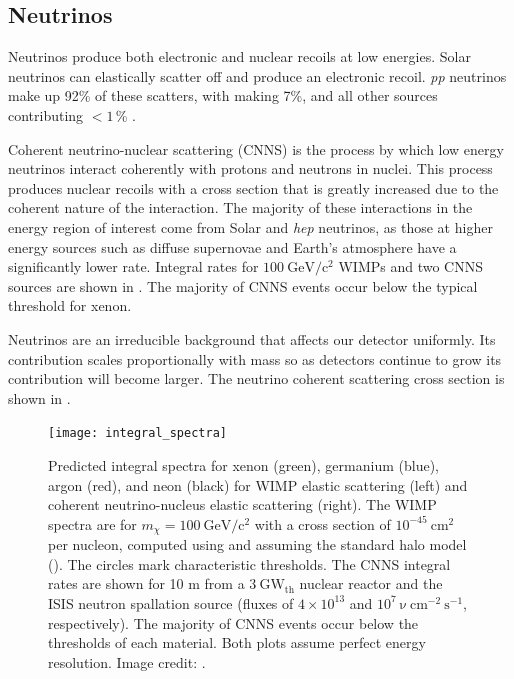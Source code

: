 \subsection{Neutrinos}
\label{subsec:neutrinos}
Neutrinos produce both electronic and nuclear recoils at low energies.  Solar neutrinos can elastically scatter off \electron
and produce an electronic recoil.  \textit{pp} neutrinos make up 92\% of these scatters, with  making 7\%, and all other
sources contributing $< 1\, $\% .

Coherent neutrino-nuclear scattering (CNNS) is the process by which low energy neutrinos interact coherently with protons and neutrons in
nuclei.  This process produces nuclear recoils with a cross section that is greatly increased due to the coherent nature of the
interaction.  The majority of these interactions in the energy region of interest come from Solar 
and \textit{hep} neutrinos, as those at higher energy sources such as diffuse supernovae and Earth's atmosphere have a significantly
lower rate.  Integral rates for $100\ \mathrm{GeV/c^2}$ WIMPs and two CNNS sources are shown in
.  The majority of CNNS events occur below the typical threshold for xenon.

Neutrinos are an irreducible background that affects our detector uniformly.  Its contribution scales proportionally with mass so as
detectors continue to grow its contribution will become larger.  The neutrino coherent scattering cross section is shown in
.

\begin{figure}
\centering
\texttt{[image: integral\_spectra]}
\caption[Predicted integral spectra for xenon, germanium, argon, and neon for WIMP elastic scattering
and CNNS.  The WIMP spectra are for $m_{\chi} = 100\ \mathrm{GeV/c^2}$ with a
cross section of $10^{-45}\ \mathrm{cm^2}$ per nucleon.  The CNNS integral rates are shown for 10 m from a $3\ \mathrm{GW_{th}}$ nuclear
reactor and the ISIS neutron spallation source.]{Predicted integral spectra for xenon (green), germanium (blue), argon (red), and
neon (black) for WIMP elastic scattering (left)
and coherent neutrino-nucleus elastic scattering (right).  The WIMP spectra are for $m_{\chi} = 100\ \mathrm{GeV/c^2}$ with a
cross section of $10^{-45}\ \mathrm{cm^2}$ per nucleon, computed using  and assuming the standard halo model
().  The circles mark
characteristic thresholds.  The CNNS integral rates are shown for 10 m from a $3\ \mathrm{GW_{th}}$ nuclear
reactor and the ISIS neutron spallation source  (fluxes of
$4 \times 10^{13}$ and $10^{7}\ \mathrm{\nu\ cm^{-2}\ s^{-1}}$, respectively).  The majority of CNNS events occur below the
thresholds of each material.  Both plots assume perfect energy resolution.  Image credit:
.}
\label{fig:neutrinos_integral_spectra}
\end{figure}


